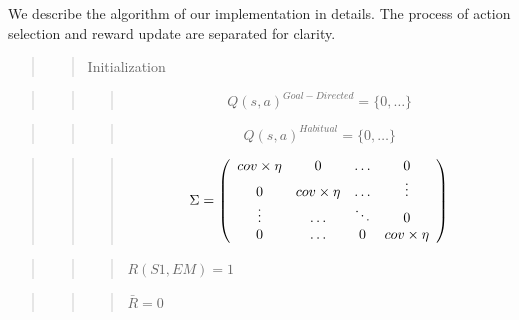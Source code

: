 \documentclass[10pt,a4paper,onecolumn]{article}
\begin{document}
We describe the algorithm of our implementation in details. The process
of action selection and reward update are separated for clarity.

\begin{quote}
\begin{quote}
Initialization
\end{quote}
\end{quote}

\begin{quote}
\begin{quote}
\begin{quote}
\[Q(s, a)^{Goal-Directed} = \{ 0, \ldots \}\]
\end{quote}
\end{quote}
\end{quote}

\begin{quote}
\begin{quote}
\begin{quote}
\[Q(s, a)^{Habitual} = \{ 0, \dots \}\]
\end{quote}
\end{quote}
\end{quote}

\begin{quote}
\begin{quote}
\begin{quote}
\[
\Sigma = \left(
    \begin{array}{*4{c}}
    cov \times \eta &  0 &  \ldots & 0 \\
     0 &  cov \times \eta &  \ldots & \vdots \\
    \vdots &  \ldots &  \ddots & 0 \\
     0 &  \ldots &  0 & cov \times \eta \\     
  \end{array}\right)
\]
\end{quote}
\end{quote}
\end{quote}

\begin{quote}
\begin{quote}
\begin{quote}
\(R(S1, EM) = 1\)
\end{quote}
\end{quote}
\end{quote}

\begin{quote}
\begin{quote}
\begin{quote}
\(\bar{R} = 0\)
\end{quote}
\end{quote}
\end{quote}
\end{document}

